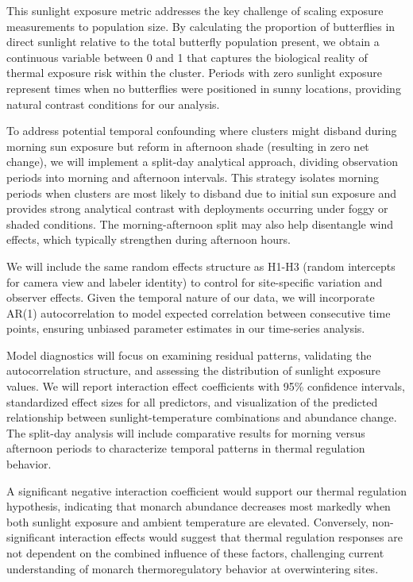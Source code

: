 This sunlight exposure metric addresses the key challenge of scaling exposure measurements to population size. By calculating the proportion of butterflies in direct sunlight relative to the total butterfly population present, we obtain a continuous variable between 0 and 1 that captures the biological reality of thermal exposure risk within the cluster. Periods with zero sunlight exposure represent times when no butterflies were positioned in sunny locations, providing natural contrast conditions for our analysis.

To address potential temporal confounding where clusters might disband during morning sun exposure but reform in afternoon shade (resulting in zero net change), we will implement a split-day analytical approach, dividing observation periods into morning and afternoon intervals. This strategy isolates morning periods when clusters are most likely to disband due to initial sun exposure and provides strong analytical contrast with deployments occurring under foggy or shaded conditions. The morning-afternoon split may also help disentangle wind effects, which typically strengthen during afternoon hours.

We will include the same random effects structure as H1-H3 (random intercepts for camera view and labeler identity) to control for site-specific variation and observer effects. Given the temporal nature of our data, we will incorporate AR(1) autocorrelation to model expected correlation between consecutive time points, ensuring unbiased parameter estimates in our time-series analysis.

Model diagnostics will focus on examining residual patterns, validating the autocorrelation structure, and assessing the distribution of sunlight exposure values. We will report interaction effect coefficients with 95\% confidence intervals, standardized effect sizes for all predictors, and visualization of the predicted relationship between sunlight-temperature combinations and abundance change. The split-day analysis will include comparative results for morning versus afternoon periods to characterize temporal patterns in thermal regulation behavior.

A significant negative interaction coefficient would support our thermal regulation hypothesis, indicating that monarch abundance decreases most markedly when both sunlight exposure and ambient temperature are elevated. Conversely, non-significant interaction effects would suggest that thermal regulation responses are not dependent on the combined influence of these factors, challenging current understanding of monarch thermoregulatory behavior at overwintering sites.

